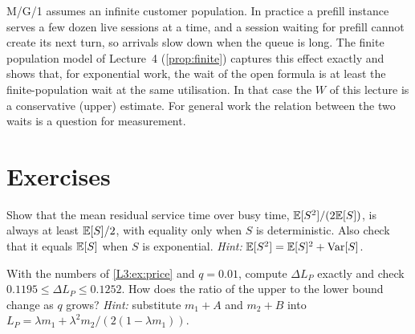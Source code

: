 

\begin{remark}\label{L3:rem:finite}
M/G/1 assumes an infinite customer population. In practice a prefill instance
serves a few dozen live sessions at a time, and a session waiting for prefill cannot
create its next turn, so arrivals slow down when the queue is long. The finite
population model of Lecture~4 (\cref{prop:finite}) captures this effect exactly
and shows that, for exponential work, the wait of the open formula is at least
the finite-population wait at the same utilisation. In that case the $W$ of this
lecture is a conservative (upper) estimate. For general work the relation between
the two waits is a question for measurement.
\end{remark}

\section{Exercises}

\begin{exercise}\label{L3:ex:1}
Show that the mean residual service time over busy time, $\mathbb{E}[S^2]/(2\mathbb{E}[S])$, is
always at least $\mathbb{E}[S]/2$, with equality only when $S$ is deterministic. Also
check that it equals $\mathbb{E}[S]$ when $S$ is exponential.
\emph{Hint:} $\mathbb{E}[S^2]=\mathbb{E}[S]^2+\operatorname{Var}[S]$.
\end{exercise}

\begin{exercise}\label{L3:ex:2}
With the numbers of \cref{L3:ex:price} and $q=0.01$, compute $\Delta L_P$ exactly
and check $0.1195\le\Delta L_P\le0.1252$. How does the ratio of the upper to the
lower bound change as $q$ grows?
\emph{Hint:} substitute $m_1+A$ and $m_2+B$ into
$L_P=\lambda m_1+\lambda^2m_2/(2(1-\lambda m_1))$.
\end{exercise}
